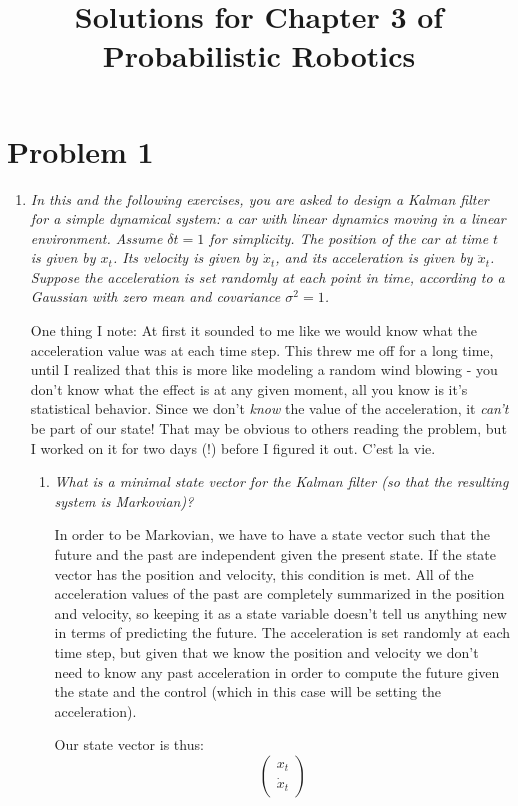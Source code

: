 \documentclass[10pt]{article}
\begin{document}
\title{Solutions for Chapter 3 of Probabilistic Robotics}

\section{Problem 1}
\begin{enumerate}
  \item \textit{In this and the following exercises, you are asked to design a Kalman
filter for a simple dynamical system: a car with linear dynamics moving in a
linear environment. Assume $\delta t = 1$ for simplicity. The position of the
car at time $t$ is given by $x_t$. Its velocity is given by $\dot{x}_t$, and its
acceleration is given by $\ddot{x}_t$. Suppose the acceleration is set
randomly at each point in time, according to a Gaussian with zero mean and
covariance $\sigma^2 = 1$.}

One thing I note: At first it sounded to me like we would know what the
acceleration value was at each time step. This threw me off for a long time,
until I realized that this is more like modeling a random wind blowing - you
don't know what the effect is at any given moment, all you know is it's
statistical behavior. Since we don't \textit{know} the value of the
acceleration, it \textit{can't} be part of our state! That may be obvious to
others reading the problem, but I worked on it for two days (!) before I figured
it out. C'est la vie.

  \begin{enumerate}
  \item \textit{What is a minimal state vector for the Kalman filter (so that the
    resulting system is Markovian)?} 

    In order to be Markovian, we have to have a state vector such that the
    future and the past are independent given the present state. If the state
    vector has the position and velocity, this condition is met. All of the
    acceleration values of the past are completely summarized in the position
    and velocity, so keeping it as a state variable doesn't tell us anything new
    in terms of predicting the future. The acceleration is set randomly at each
    time step, but given that we know the position and velocity we don't need to
    know any past acceleration in order to compute the future given the state
    and the control (which in this case will be setting the acceleration).

    Our state vector is thus:
  $$\begin{pmatrix}x_t \\ \dot{x}_t\end{pmatrix}$$


\end{enumerate}
\end{enumerate}
\end{document}
